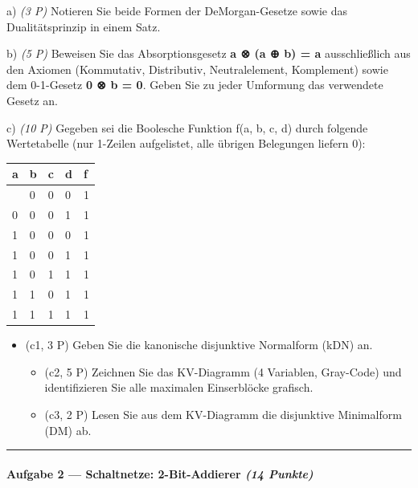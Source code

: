 \documentclass[11pt, a4paper]{article}
\begin{document}
a) \textit{(3 P)} Notieren Sie beide Formen der DeMorgan-Gesetze sowie das Dualitätsprinzip in einem Satz.


b) \textit{(5 P)} Beweisen Sie das Absorptionsgesetz \textbf{a ⊗ (a ⊕ b) = a} ausschließlich aus den Axiomen (Kommutativ, Distributiv, Neutralelement, Komplement) sowie dem 0-1-Gesetz \textbf{0 ⊗ b = 0}. Geben Sie zu jeder Umformung das verwendete Gesetz an.


c) \textit{(10 P)} Gegeben sei die Boolesche Funktion f(a, b, c, d) durch folgende Wertetabelle (nur 1-Zeilen aufgelistet, alle übrigen Belegungen liefern 0):



{\small
\begin{tabularx}{\linewidth}{XXXXX}
\hline
\rowcolor{tableheadbg}
{\color{white}\textbf{a}} & {\color{white}\textbf{b}} & {\color{white}\textbf{c}} & {\color{white}\textbf{d}} & {\color{white}\textbf{f}} \\[2pt]
\hline
\endhead
\hline
\endfoot
0 & 0 & 0 & 0 & 1 \\
0 & 0 & 0 & 1 & 1 \\
1 & 0 & 0 & 0 & 1 \\
1 & 0 & 0 & 1 & 1 \\
1 & 0 & 1 & 1 & 1 \\
1 & 1 & 0 & 1 & 1 \\
1 & 1 & 1 & 1 & 1 \\
\end{tabularx}
}


\begin{itemize}
  \item (c1, 3 P) Geben Sie die kanonische disjunktive Normalform (kDN) an.
\begin{itemize}
  \item (c2, 5 P) Zeichnen Sie das KV-Diagramm (4 Variablen, Gray-Code) und identifizieren Sie alle maximalen Einserblöcke grafisch.
  \item (c3, 2 P) Lesen Sie aus dem KV-Diagramm die disjunktive Minimalform (DM) ab.
\end{itemize}
\end{itemize}


\noindent\textcolor{rulegray}{\rule{\linewidth}{0.4pt}}


\paragraph{Aufgabe 2 — Schaltnetze: 2-Bit-Addierer \textit{(14 Punkte)}}\mbox{}\\[2pt]
\end{document}
